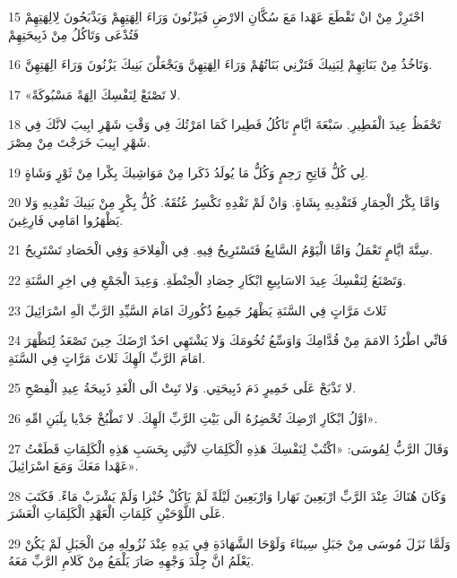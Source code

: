 \par 15 احْتَرِزْ مِنْ انْ تَقْطَعَ عَهْدا مَعَ سُكَّانِ الارْضِ فَيَزْنُونَ وَرَاءَ الِهَتِهِمْ وَيَذْبَحُونَ لِالِهَتِهِمْ فَتُدْعَى وَتَاكُلُ مِنْ ذَبِيحَتِهِمْ
\par 16 وَتَاخُذُ مِنْ بَنَاتِهِمْ لِبَنِيكَ فَتَزْنِي بَنَاتُهُمْ وَرَاءَ الِهَتِهِنَّ وَيَجْعَلْنَ بَنِيكَ يَزْنُونَ وَرَاءَ الِهَتِهِنَّ.
\par 17 «لا تَصْنَعْ لِنَفْسِكَ الِهَةً مَسْبُوكَةً.
\par 18 تَحْفَظُ عِيدَ الْفَطِيرِ. سَبْعَةَ ايَّامٍ تَاكُلُ فَطِيرا كَمَا امَرْتُكَ فِي وَقْتِ شَهْرِ ابِيبَ لانَّكَ فِي شَهْرِ ابِيبَ خَرَجْتَ مِنْ مِصْرَ.
\par 19 لِي كُلُّ فَاتِحِ رَحِمٍ وَكُلُّ مَا يُولَدُ ذَكَرا مِنْ مَوَاشِيكَ بِكْرا مِنْ ثَوْرٍ وَشَاةٍ.
\par 20 وَامَّا بِكْرُ الْحِمَارِ فَتَفْدِيهِ بِشَاةٍ. وَانْ لَمْ تَفْدِهِ تَكْسِرُ عُنُقَهُ. كُلُّ بِكْرٍ مِنْ بَنِيكَ تَفْدِيهِ وَلا يَظْهَرُوا امَامِي فَارِغِينَ.
\par 21 سِتَّةَ ايَّامٍ تَعْمَلُ وَامَّا الْيَوْمُ السَّابِعُ فَتَسْتَرِيحُ فِيهِ. فِي الْفِلاحَةِ وَفِي الْحَصَادِ تَسْتَرِيحُ.
\par 22 وَتَصْنَعُ لِنَفْسِكَ عِيدَ الاسَابِيعِ ابْكَارِ حِصَادِ الْحِنْطَةِ. وَعِيدَ الْجَمْعِ فِي اخِرِ السَّنَةِ.
\par 23 ثَلاثَ مَرَّاتٍ فِي السَّنَةِ يَظْهَرُ جَمِيعُ ذُكُورِكَ امَامَ السَّيِّدِ الرَّبِّ الَهِ اسْرَائِيلَ
\par 24 فَانِّي اطْرُدُ الامَمَ مِنْ قُدَّامِكَ وَاوَسِّعُ تُخُومَكَ وَلا يَشْتَهِي احَدٌ ارْضَكَ حِينَ تَصْعَدُ لِتَظْهَرَ امَامَ الرَّبِّ الَهِكَ ثَلاثَ مَرَّاتٍ فِي السَّنَةِ.
\par 25 لا تَذْبَحْ عَلَى خَمِيرٍ دَمَ ذَبِيحَتِي. وَلا تَبِتْ الَى الْغَدِ ذَبِيحَةُ عِيدِ الْفِصْحِ.
\par 26 اوَّلُ ابْكَارِ ارْضِكَ تُحْضِرُهُ الَى بَيْتِ الرَّبِّ الَهِكَ. لا تَطْبُخْ جَدْيا بِلَبَنِ امِّهِ».
\par 27 وَقَالَ الرَّبُّ لِمُوسَى: «اكْتُبْ لِنَفْسِكَ هَذِهِ الْكَلِمَاتِ لانَّنِي بِحَسَبِ هَذِهِ الْكَلِمَاتِ قَطَعْتُ عَهْدا مَعَكَ وَمَعَ اسْرَائِيلَ».
\par 28 وَكَانَ هُنَاكَ عِنْدَ الرَّبِّ ارْبَعِينَ نَهَارا وَارْبَعِينَ لَيْلَةً لَمْ يَاكُلْ خُبْزا وَلَمْ يَشْرَبْ مَاءً. فَكَتَبَ عَلَى اللَّوْحَيْنِ كَلِمَاتِ الْعَهْدِ الْكَلِمَاتِ الْعَشَرَ.
\par 29 وَلَمَّا نَزَلَ مُوسَى مِنْ جَبَلِ سِينَاءَ وَلَوْحَا الشَّهَادَةِ فِي يَدِهِ عِنْدَ نُزُولِهِ مِنَ الْجَبَلِ لَمْ يَكُنْ يَعْلَمُ انَّ جِلْدَ وَجْهِهِ صَارَ يَلْمَعُ مِنْ كَلامِ الرَّبِّ مَعَهُ.
